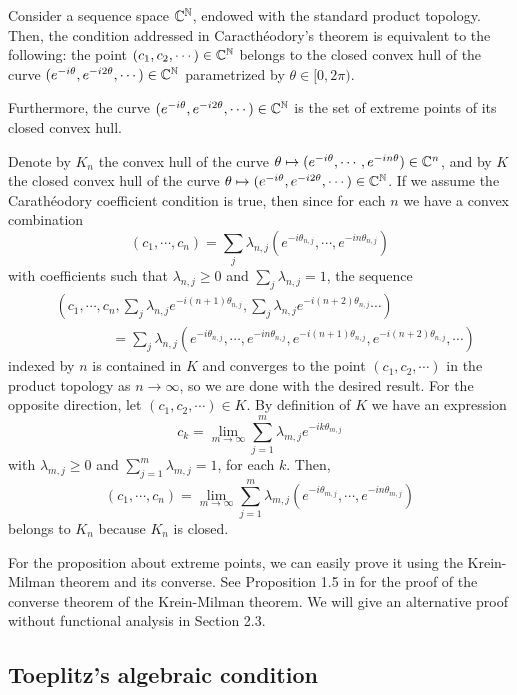 \documentclass[a4paper]{article}
\begin{document}
\begin{prop}
Consider a sequence space $\mathbb{C}^{\mathbb{N}}$, endowed with the standard product topology.
Then, the condition addressed in Caracth\'eodory's theorem is equivalent to the following: the point $(c_1,c_2,\cdots)\in\mathbb{C}^{\mathbb{N}}$ belongs to the closed convex hull of the curve $(e^{-i\theta},e^{-i2\theta},\cdots)\in\mathbb{C}^{\mathbb{N}}$ parametrized by $\theta\in[0,2\pi)$.

Furthermore, the curve $(e^{-i\theta},e^{-i2\theta},\cdots)\in\mathbb{C}^{\mathbb{N}}$ is the set of extreme points of its closed convex hull.
\end{prop}
\begin{pf}
Denote by $K_n$ the convex hull of the curve $\theta\mapsto(e^{-i\theta},\cdots,e^{-in\theta})\in\mathbb{C}^n$, and by $K$ the closed convex hull of the curve $\theta\mapsto(e^{-i\theta},e^{-i2\theta},\cdots)\in\mathbb{C}^{\mathbb{N}}$.
If we assume the Carath\'eodory coefficient condition is true, then since for each $n$ we have a convex combination
\[(c_1,\cdots,c_n)=\sum_j\lambda_{n,j}(e^{-i\theta_{n,j}},\cdots,e^{-in\theta_{n,j}})\]
with coefficients such that $\lambda_{n,j}\ge0$ and $\sum_j\lambda_{n,j}=1$, the sequence
\begin{align*}
&(c_1,\cdots,c_n,\sum_j\lambda_{n,j}e^{-i(n+1)\theta_{n,j}},\sum_j\lambda_{n,j}e^{-i(n+2)\theta_{n,j}}\cdots)\\
&\qquad\qquad=\sum_j\lambda_{n,j}(e^{-i\theta_{n,j}},\cdots,e^{-in\theta_{n,j}},e^{-i(n+1)\theta_{n,j}},e^{-i(n+2)\theta_{n,j}},\cdots)
\end{align*}
indexed by $n$ is contained in $K$ and converges to the point $(c_1,c_2,\cdots)$ in the product topology as $n\to\infty$, so we are done with the desired result.
For the opposite direction, let $(c_1,c_2,\cdots)\in K$.
By definition of $K$ we have an expression
\[c_k=\lim_{m\to\infty}\sum_{j=1}^m\lambda_{m,j}e^{-ik\theta_{m,j}}\]
with $\lambda_{m,j}\ge0$ and $\sum_{j=1}^m\lambda_{m,j}=1$, for each $k$.
Then,
\[(c_1,\cdots,c_n)=\lim_{m\to\infty}\sum_{j=1}^m\lambda_{m,j}(e^{-i\theta_{m,j}},\cdots,e^{-in\theta_{m,j}})\]
belongs to $K_n$ because $K_n$ is closed.

For the proposition about extreme points, we can easily prove it using the Krein-Milman theorem and its converse.
See Proposition 1.5 in \cite{phelps2001lectures} for the proof of the converse theorem of the Krein-Milman theorem.
We will give an alternative proof without functional analysis in Section 2.3.
\end{pf}


\subsection{Toeplitz's algebraic condition}
\end{document}
